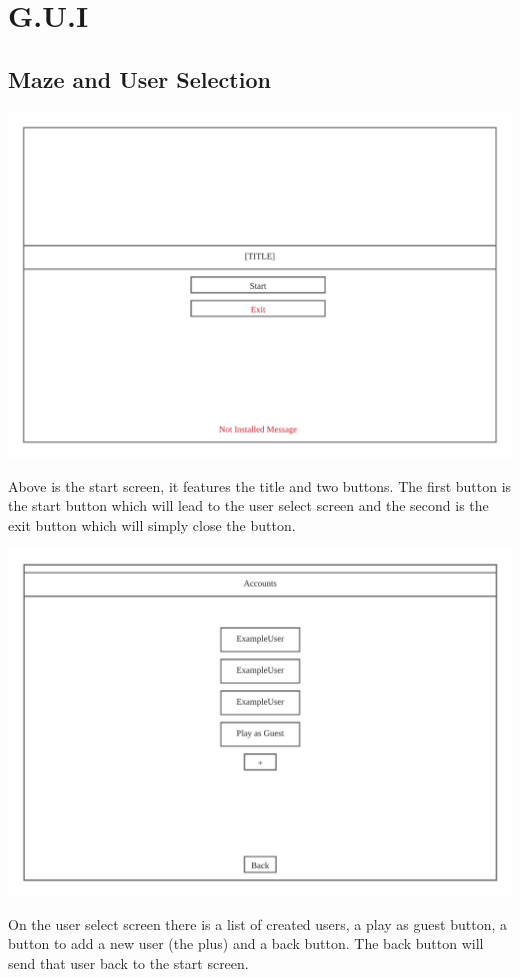 \documentclass{article}
\begin{document}
\clearpage
\section{G.U.I }
\subsection{Maze and User Selection}
\begin{center}
	\includegraphics[scale=0.7]{Start Screen}

	Above is the start screen, it features the title and two buttons. The first button is the start button which will lead to the user select
	screen and the second is the exit button which will simply close the button.
\end{center}
\begin{center}
	\includegraphics[scale=0.7]{User Select Screen}

	On the user select screen there is a list of created users, a play as guest button, a button to add a new user (the plus) and a back button. The back button
	will send that user back to the start screen.
\end{center}
\end{document}
